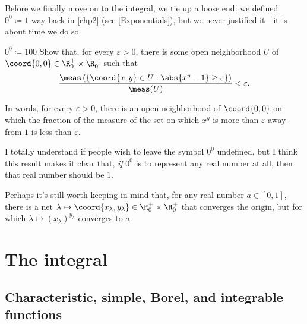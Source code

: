 Before we finally move on to the integral, we tie up a loose end:  we defined $0^0\coloneqq 1$ way back in \cref{chp2} (see \cref{Exponentials}), but we never justified it---it is about time we do so.
\begin{exr}{$0^0\coloneqq 1$}{00}
Show that, for every $\varepsilon >0$, there is some open neighborhood $U$ of $\coord{0,0}\in \R _0^+\times \R _0^+$ such that
\begin{equation}
\frac{\meas \left( \left\{ \coord{x,y}\in U:\abs{x^y-1}\geq \varepsilon \right\} \right)}{\meas (U)}<\varepsilon .
\end{equation}
\begin{rmk}
In words, for every $\varepsilon >0$, there is an open neighborhood of $\coord{0,0}$ on which the fraction of the measure of the set on which $x^y$ is more than $\varepsilon$ away from $1$ is less than $\varepsilon$.
\end{rmk}
\begin{rmk}
I totally understand if people wish to leave the symbol $0^0$ undefined, but I think this result makes it clear that, \emph{if} $0^0$ is to represent any real number at all, then that real number should be $1$.
\end{rmk}
\begin{rmk}
Perhaps it's still worth keeping in mind that, for any real number $a\in [0,1]$, there is a net $\lambda \mapsto \coord{x_\lambda ,y_\lambda}\in \R _0^+\times \R _0^+$ that converges the origin, but for which $\lambda \mapsto (x_\lambda )^{y_\lambda}$ converges to $a$.
\end{rmk}
\end{exr}

\section{The integral}


\subsection[Char., simple, Borel, and integrable functions]{Characteristic, simple, Borel, and integrable functions}

